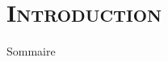 \section{\scshape Introduction}
\begin{frame}

\titlepage
\end{frame}

\begin{frame}{Sommaire}
\tableofcontents
\end{frame}

